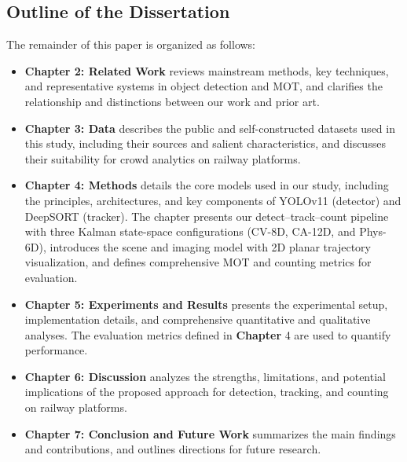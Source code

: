 \subsection{Outline of the Dissertation}
The remainder of this paper is organized as follows:
\begin{itemize}
  \item \textbf{Chapter 2: Related Work} reviews mainstream methods, key techniques, and representative systems in object detection and MOT, and clarifies the relationship and distinctions between our work and prior art.
  \item \textbf{Chapter 3: Data} describes the public and self-constructed datasets used in this study, including their sources and salient characteristics, and discusses their suitability for crowd analytics on railway platforms.
  \item \textbf{Chapter 4: Methods} details the core models used in our study, including the principles, architectures, and key components of YOLOv11 (detector) and DeepSORT (tracker). The chapter presents our detect–track–count pipeline with three Kalman state-space configurations (CV-8D, CA-12D, and Phys-6D), introduces the scene and imaging model with 2D planar trajectory visualization, and defines comprehensive MOT and counting metrics for evaluation.
  \item \textbf{Chapter 5: Experiments and Results} presents the experimental setup, implementation details, and comprehensive quantitative and qualitative analyses. The evaluation metrics defined in \textbf{Chapter} 4 are used to quantify performance.
  \item \textbf{Chapter 6: Discussion} analyzes the strengths, limitations, and potential implications of the proposed approach for detection, tracking, and counting on railway platforms.
  \item \textbf{Chapter 7: Conclusion and Future Work} summarizes the main findings and contributions, and outlines directions for future research.
\end{itemize}

